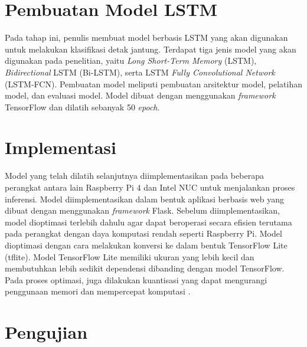 \section{Pembuatan Model LSTM}
\label{subsec: metodologi-pembuatan-model-lstm}
Pada tahap ini, penulis membuat model berbasis LSTM yang akan digunakan untuk melakukan klasifikasi detak jantung. 
Terdapat tiga jenis model yang akan digunakan pada penelitian, yaitu \textit{Long Short-Term Memory} (LSTM), \textit{Bidirectional} LSTM (Bi-LSTM), serta LSTM \textit{Fully Convolutional Network} (LSTM-FCN). 
Pembuatan model meliputi pembuatan arsitektur model, pelatihan model, dan evaluasi model.
Model dibuat dengan menggunakan \textit{framework} TensorFlow dan dilatih sebanyak 50 \textit{epoch}.



\section{Implementasi}
\label{subsec: metodologi-implementasi}

Model yang telah dilatih selanjutnya diimplementasikan pada beberapa perangkat antara lain Raspberry Pi 4 dan Intel NUC untuk menjalankan proses inferensi. Model diimplementasikan dalam bentuk aplikasi berbasis web yang dibuat dengan menggunakan \textit{framework} Flask. Sebelum diimplementasikan, model dioptimasi terlebih dahulu agar dapat beroperasi secara efisien terutama pada perangkat dengan daya komputasi rendah seperti Raspberry Pi. Model dioptimasi dengan cara melakukan konversi ke dalam bentuk TensorFlow Lite (tflite). Model TensorFlow Lite memiliki ukuran yang lebih kecil dan membutuhkan lebih sedikit dependensi dibanding dengan model TensorFlow. Pada proses optimasi, juga dilakukan kuantisasi yang dapat mengurangi penggunaan memori dan mempercepat komputasi
.


\section{Pengujian}
\label{subsec: metodologi-pengujian}

